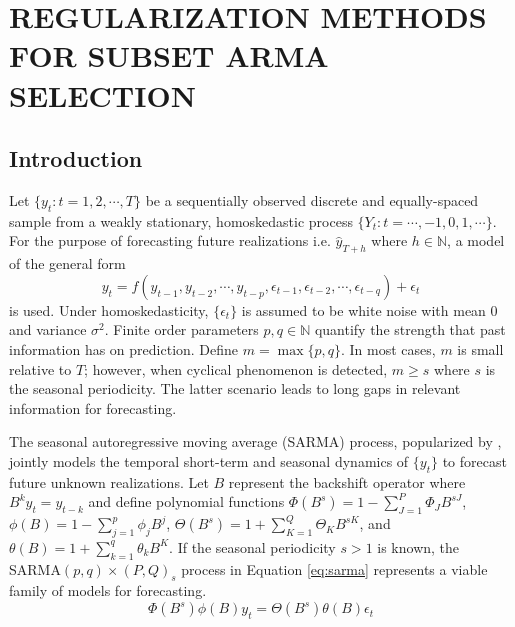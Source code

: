 \chapter{REGULARIZATION METHODS FOR SUBSET ARMA SELECTION}
\label{chap:co2}

\section{Introduction}

Let $\{y_t: t=1,2,\cdots,T\}$ be a sequentially observed discrete and equally-spaced sample from a weakly stationary, homoskedastic process $\{Y_t:t=\cdots,-1,0,1,\cdots\}$. For the purpose of forecasting future realizations i.e. $\hat{y}_{T+h}$ where $h\in\mathbb{N}$, a model of the general form $$y_{t}=f(y_{t-1},y_{t-2},\cdots,y_{t-p},\epsilon_{t-1},\epsilon_{t-2},\cdots,\epsilon_{t-q})+\epsilon_t$$ is used. Under homoskedasticity, $\{\epsilon_t\}$ is assumed to be white noise with mean 0 and variance $\sigma^2$.  Finite order parameters $p,q\in\mathbb{N}$ quantify the strength that past information has on prediction. Define $m=\max\{p,q\}$. In most cases, $m$ is small relative to $T$; however, when cyclical phenomenon is detected, $m\geq s$ where $s$ is the seasonal periodicity. The latter scenario leads to long gaps in relevant information for forecasting.

The seasonal autoregressive moving average (SARMA) process, popularized by \cite{Box1976}, jointly models the temporal short-term and seasonal dynamics of $\{y_t\}$ to forecast future unknown realizations. Let $B$ represent the backshift operator  where $B^ky_{t}=y_{t-k}$ and define polynomial functions $\Phi(B^s)=1-\sum\limits_{J=1}^P \Phi_J B^{sJ}$, $\phi(B)=1-\sum\limits_{j=1}^p \phi_j B^{j}$, $\Theta(B^s)=1+\sum\limits_{K=1}^Q \Theta_K B^{sK}$, and $\theta(B)=1+\sum\limits_{k=1}^q \theta_k B^{K}$. If the seasonal periodicity $s>1$ is known, the SARMA$(p,q)\times(P,Q)_{s}$ process in Equation \ref{eq:sarma} represents a viable family of models for forecasting.
\begin{equation}
\label{eq:sarma}
\Phi(B^s)\phi(B)y_t=\Theta(B^s)\theta(B)\epsilon_t
\end{equation}

